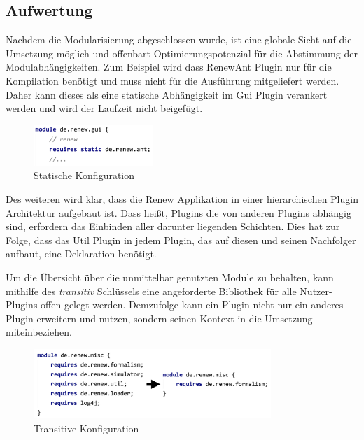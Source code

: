 \subsection{Aufwertung} \label{sub:optimierung}
	Nachdem die Modularisierung abgeschlossen wurde, ist eine globale Sicht auf die Umsetzung möglich und offenbart Optimierungspotenzial für die Abstimmung der Modulabhängigkeiten. Zum Beispiel wird dass RenewAnt Plugin nur für die Kompilation benötigt und muss nicht für die Ausführung mitgeliefert werden. Daher kann dieses als eine statische Abhängigkeit im Gui Plugin verankert werden und wird der Laufzeit nicht beigefügt.\bigbreak

	\begin{figure}[h!]
	  \centering
	  \includegraphics[width=0.4\textwidth]{material/images/gui_config.png}
	  \caption{Statische Konfiguration}
	  \label{fig:remote_config}
	\end{figure}

	Des weiteren wird klar, dass die Renew Applikation in einer hierarchischen Plugin Architektur aufgebaut ist. Dass heißt, Plugins die von anderen Plugins abhängig sind, erfordern das Einbinden aller darunter liegenden Schichten. Dies hat zur Folge, dass das Util Plugin in jedem Plugin, das auf diesen und seinen Nachfolger aufbaut, eine Deklaration benötigt. \newline

	Um die Übersicht über die unmittelbar genutzten Module zu behalten, kann mithilfe des \textit{transitiv}  Schlüssels eine angeforderte Bibliothek für alle Nutzer-Plugins offen gelegt werden. Demzufolge kann ein Plugin nicht nur ein anderes Plugin erweitern und nutzen, sondern seinen Kontext in die Umsetzung miteinbeziehen. \bigbreak

	\begin{figure}[h!]
	  \centering
	  \includegraphics[width=0.8\textwidth]{material/images/misc_trans.png}
	  \caption{Transitive Konfiguration}
	  \label{fig:trans_config}
	\end{figure}

